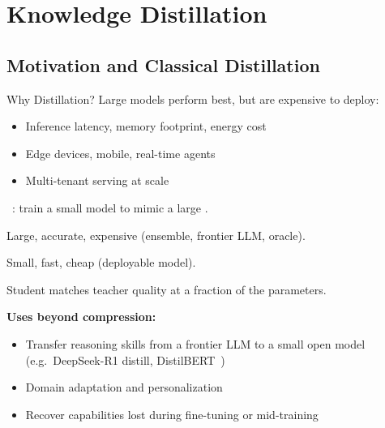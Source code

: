 
\section{Knowledge Distillation}

\subsection{Motivation and Classical Distillation}

\begin{frame}{Why Distillation?}
  Large models perform best, but are expensive to deploy:
  \begin{itemize}[nosep]
    \item Inference latency, memory footprint, energy cost
    \item Edge devices, mobile, real-time agents
    \item Multi-tenant serving at scale
  \end{itemize}

  \vspace{0.4em}
  ~\cite{bucilua2006compression,hinton2015distillation}: train a small  model to mimic a large .

  \vspace{0.3em}
  \begin{description}[nosep]
    \item[Teacher:] Large, accurate, expensive (ensemble, frontier LLM, oracle).
    \item[Student:] Small, fast, cheap (deployable model).
    \item[Goal:] Student matches teacher quality at a fraction of the parameters.
  \end{description}

  \vspace{0.4em}
  \textbf{Uses beyond compression:}
  \begin{itemize}[nosep]
    \item Transfer reasoning skills from a frontier LLM to a small open model (e.g.\ DeepSeek-R1 distill, DistilBERT~\cite{sanh2019distilbert})
    \item Domain adaptation and personalization
    \item Recover capabilities lost during fine-tuning or mid-training
  \end{itemize}
\end{frame}

